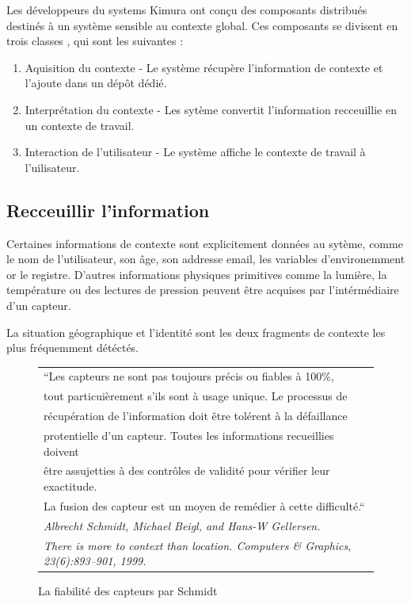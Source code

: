 Les développeurs du systems Kimura ont conçu des composants distribués destinés
à un système sensible au contexte global. Ces composants se divisent en trois
classes \cite{voida_integrating_2002}, qui sont les suivantes :

\begin{enumerate}
    \item Aquisition du contexte - Le système récupère l'information de contexte
	    et l'ajoute dans un dépôt dédié.
    \item Interprétation du contexte - Les sytème convertit l'information
	    recceuillie en un contexte de travail.
    \item Interaction de l'utilisateur - Le système affiche le contexte de
	    travail à l'uilisateur.
\end{enumerate}

\subsection{Recceuillir l'information}

Certaines informations de contexte sont explicitement données au sytème, comme
le nom de l'utilisateur, son âge, son addresse email, les variables
d'environemment or le registre. D'autres informations physiques primitives comme
la lumière, la température ou des lectures de pression peuvent être acquises par
l'intérmédiaire d'un capteur.

La situation géographique et l'identité sont les deux fragments de contexte les
plus fréquemment détéctés.

\begin{figure}[h]
  \centering
  \begin{tabular}{l}
    ``Les capteurs ne sont pas toujours précis ou fiables à 100\%, \\
    tout particuièrement s'ils sont à usage unique. Le processus de \\
    récupération de l'information doit être tolérent à la défaillance \\
    protentielle d'un capteur. Toutes les informations recueillies doivent \\
    être assujetties à des contrôles de validité pour vérifier leur exactitude.\\
    La fusion des capteur est un moyen de remédier à cette difficulté.``
    \cite{schmidt_there_1999} \\
    \em \footnotesize Albrecht Schmidt, Michael Beigl, and Hans-W Gellersen. \\
    \em \footnotesize There is more to context than location. Computers \&
    Graphics, 23(6):893–901, 1999.
  \end{tabular}
  \caption{La fiabilité des capteurs par Schmidt}
  \label{fig:quote}
\end{figure}

